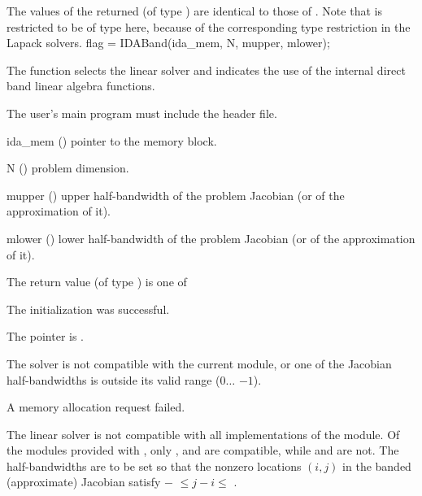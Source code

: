 {
  The values of the returned  (of type ) are identical
  to those of .
}
{
  Note that  is restricted to be of type  here, because
  of the corresponding type restriction in the Lapack solvers.
}
{
  flag = IDABand(ida\_mem, N, mupper, mlower);
}
{
  The function  selects the {\idaband} linear solver and indicates
  the use of the internal direct band linear algebra functions.

  The user's main program must include the  header file.
}
{
  \begin{args}
  \item[ida\_mem] ()
    pointer to the {\idas} memory block.
  \item[N] ()
    problem dimension.
  \item[mupper] ()
    upper half-bandwidth of the problem Jacobian (or of the approximation of it).
  \item[mlower] ()
    lower half-bandwidth of the problem Jacobian (or of the approximation of it).
  \end{args}
}
{
  The return value  (of type ) is one of
  \begin{args}
  \item[\Id{IDABAND\_SUCCESS}] 
    The {\idaband} initialization was successful.
  \item[\Id{IDABAND\_MEM\_NULL}]
    The  pointer is .
  \item[\Id{IDABAND\_ILL\_INPUT}]
    The {\idaband} solver is not compatible with the current {\nvector} module, or
    one of the Jacobian half-bandwidths is outside its valid range ($0 \ldots$
    $-1$).
  \item[\Id{IDABAND\_MEM\_FAIL}]
    A memory allocation request failed.
  \end{args}
}
{
  The {\idaband} linear solver is not compatible with all
  implementations of the {\nvector} module.  Of the {\nvector} modules
  provided with {\sundials}, only {\nvecs}, {\nvecopenmp} and
  {\nvecpthreads} are compatible, while {\nvecp} and {\nvecph} are not. 
  The half-bandwidths are to be set so that the nonzero locations $(i,j)$ in the
  banded (approximate) Jacobian satisfy $-$ $\leq j-i \leq$ .
}
